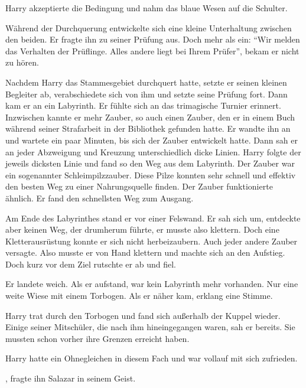 Harry akzeptierte die Bedingung und nahm das blaue Wesen auf die Schulter.

Während der Durchquerung entwickelte sich eine kleine Unterhaltung zwischen den beiden. Er fragte ihn zu seiner Prüfung aus. Doch mehr als ein: \enquote{Wir melden das Verhalten der Prüflinge. Alles andere liegt bei Ihrem Prüfer}, bekam er nicht zu hören.

Nachdem Harry das Stammesgebiet durchquert hatte, setzte er seinen kleinen Begleiter ab, verabschiedete sich von ihm und setzte seine Prüfung fort. Dann kam er an ein Labyrinth. Er fühlte sich an das trimagische Turnier erinnert. Inzwischen kannte er mehr Zauber, so auch einen Zauber, den er in einem Buch während seiner Strafarbeit in der Bibliothek gefunden hatte. Er wandte ihn an und wartete ein paar Minuten, bis sich der Zauber entwickelt hatte. Dann sah er an jeder Abzweigung und Kreuzung unterschiedlich dicke Linien. Harry folgte der jeweils dicksten Linie und fand so den Weg aus dem Labyrinth. Der Zauber war ein sogenannter Schleimpilzzauber. Diese Pilze konnten sehr schnell und effektiv den besten Weg zu einer Nahrungsquelle finden. Der Zauber funktionierte ähnlich. Er fand den schnellsten Weg zum Ausgang.

Am Ende des Labyrinthes stand er vor einer Felswand. Er sah sich um, entdeckte aber keinen Weg, der drumherum führte, er musste also klettern. Doch eine Kletterausrüstung konnte er sich nicht herbeizaubern. Auch jeder andere Zauber versagte. Also musste er von Hand klettern und machte sich an den Aufstieg. Doch kurz vor dem Ziel rutschte er ab und fiel.

Er landete weich. Als er aufstand, war kein Labyrinth mehr vorhanden. Nur eine weite Wiese mit einem Torbogen. Als er näher kam, erklang eine Stimme. 

Harry trat durch den Torbogen und fand sich außerhalb der Kuppel wieder. Einige seiner Mitschüler, die nach ihm hineingegangen waren, sah er bereits. Sie mussten schon vorher ihre Grenzen erreicht haben.

Harry hatte ein Ohnegleichen in diesem Fach und war vollauf mit sich zufrieden.

, fragte ihn Salazar in seinem Geist.



